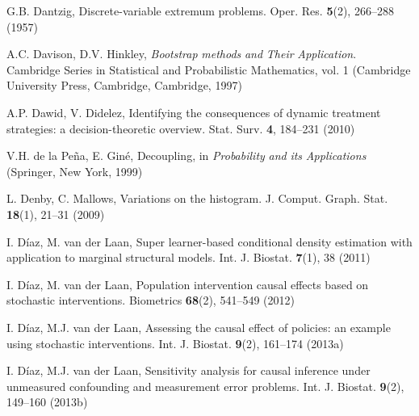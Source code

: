 \begin{list}{}{\setlength{\leftmargin}{2.1em}\setlength{\labelwidth}{0pt}
  \setlength{\labelsep}{0pt}\setlength{\itemindent}{-2.1em}
  \setlength{\parsep}{0pt}\setlength{\itemsep}{2pt}\setlength{\topsep}{0pt}}
\item\label{refentry:REF078}G.B. Dantzig, Discrete-variable extremum problems. Oper. Res. \textbf{5}(2), 266--288 (1957)\label{refend:REF078}
\item\label{refentry:REF079}A.C. Davison, D.V. Hinkley, \textit{Bootstrap} \textit{methods} \textit{and} \textit{Their} \textit{Application}. Cambridge Series in Statistical and Probabilistic Mathematics, vol. 1 (Cambridge University Press, Cambridge, Cambridge, 1997)\label{refend:REF079}
\item\label{refentry:REF080}A.P. Dawid, V. Didelez, Identifying the consequences of dynamic treatment strategies: a decision-theoretic overview. Stat. Surv. \textbf{4}, 184--231 (2010)\label{refend:REF080}
\item\label{refentry:REF081}V.H. de la Peña, E. Giné, Decoupling, in \textit{Probability} \textit{and} \textit{its} \textit{Applications} (Springer, New York, 1999)\label{refend:REF081}
\item\label{refentry:REF082}L. Denby, C. Mallows, Variations on the histogram. J. Comput. Graph. Stat. \textbf{18}(1), 21--31 (2009)\label{refend:REF082}
\item\label{refentry:REF083}I. Díaz, M. van der Laan, Super learner-based conditional density estimation with application to marginal structural models. Int. J. Biostat. \textbf{7}(1), 38 (2011)\label{refend:REF083}
\item\label{refentry:REF084}I. Díaz, M. van der Laan, Population intervention causal effects based on stochastic interventions. Biometrics \textbf{68}(2), 541--549 (2012)\label{refend:REF084}
\item\label{refentry:REF085}I. Díaz, M.J. van der Laan, Assessing the causal effect of policies: an example using stochastic interventions. Int. J. Biostat. \textbf{9}(2), 161--174 (2013a)\label{refend:REF085}
\item\label{refentry:REF086}I. Díaz, M.J. van der Laan, Sensitivity analysis for causal inference under unmeasured confounding and measurement error problems. Int. J. Biostat. \textbf{9}(2), 149--160 (2013b)\label{refend:REF086}

\end{list}
